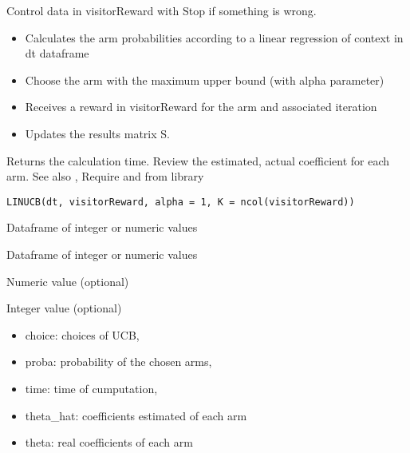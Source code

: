 \documentclass[letterpaper]{book}
\begin{document}
%
\begin{Description}\relax
Control data in visitorReward with 
Stop if something is wrong.
\begin{itemize}
 At each iteration
\item Calculates the arm probabilities according to a linear regression of context in dt dataframe
\item Choose the arm with the maximum upper bound (with alpha parameter)
\item Receives a reward in visitorReward for the arm and associated iteration
\item Updates the results matrix S.

\end{itemize}

Returns the calculation time.
Review the estimated, actual coefficient for each arm.
See also  ,
Require  and  from  library
\end{Description}
%
\begin{Usage}
\begin{verbatim}
LINUCB(dt, visitorReward, alpha = 1, K = ncol(visitorReward))
\end{verbatim}
\end{Usage}
%
\begin{Arguments}
\begin{ldescription}
\item[\code{dt}] Dataframe of integer or numeric values

\item[\code{visitorReward}] Dataframe of integer or numeric values

\item[\code{alpha}] Numeric value (optional)

\item[\code{K}] Integer value (optional)
\end{ldescription}
\end{Arguments}
%
\begin{Value}
\begin{itemize}
 List of element:
\item choice: choices of UCB,
\item proba: probability of the chosen arms,
\item time: time of cumputation,
\item theta\_hat: coefficients estimated of each arm
\item theta: real coefficients of each arm

\end{itemize}

\end{Value}
\end{document}
